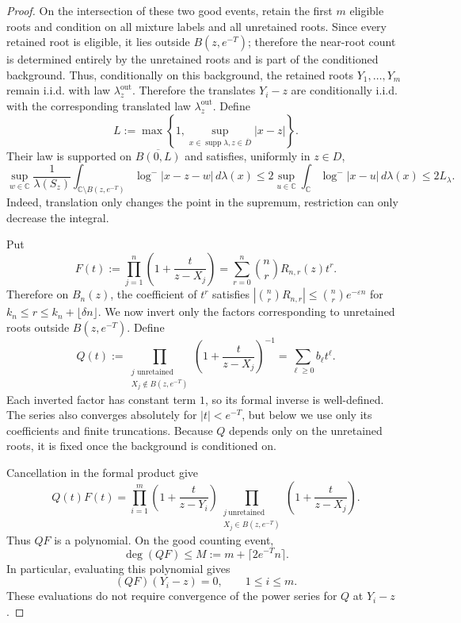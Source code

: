 \documentclass[10pt,reqno]{amsart}
\theoremstyle{remark}
\newcommand{\C}{\mathbb C}
\begin{document}
\begin{proof}
    On the intersection of these two good events, retain the first $m$ eligible roots and condition on all mixture labels and all unretained roots. Since every retained root is eligible, it lies outside $B(z,e^{-T})$; therefore the near-root count is determined entirely by the unretained roots and is part of the conditioned background. Thus, conditionally on this background, the retained roots $Y_1,\ldots, Y_m$ remain i.i.d. with law $\lambda_z^{\mathrm{out}}$. Therefore the translates $Y_i-z$ are conditionally i.i.d. with the corresponding translated law $\lambda_z^{\mathrm{out}}$. Define
    \[L:=\max\left\{1,\sup_{x\in \operatorname{supp} \lambda,z\in \overline{D}}|x-z|\right\}.\]
    Their law is supported on $\overline{B(0,L)}$ and satisfies, uniformly in $z\in D$,
    \[\sup_{w\in\C}\frac{1}{\lambda(S_z)}\int_{\C\setminus B(z,e^{-T})}\log^-|x-z-w|\,d\lambda(x)
    \le 2\sup_{u\in\C}\int_\C\log^-|x-u|\,d\lambda(x) 
    \le 2L_\lambda.\]
    Indeed, translation only changes the point in the supremum, restriction can only decrease the integral.

    Put
    \[F(t):=\prod_{j=1}^n\left(1+\frac{t}{z-X_j}\right)=\sum_{r=0}^n \binom{n}{r}R_{n,r}(z)t^r.\]
    Therefore on $B_n(z)$, the coefficient of $t^r$ satisfies $|\binom{n}{r}R_{n,r}|\le \binom{n}{r}e^{-\varepsilon n}$ for $k_n\le r\le k_n+\lfloor \delta n\rfloor$.
    We now invert only the factors corresponding to unretained roots outside $B(z,e^{-T})$. Define 
    \[Q(t):=\prod_{\substack{j\text{ unretained}\\
                     X_j\notin B(z,e^{-T})}}
    \left(1+\frac{t}{z-X_j}\right)^{-1}=\sum_{\ell\ge 0}b_\ell t^\ell.\]
    Each inverted factor has constant term $1$, so its formal inverse is well-defined. The series also converges absolutely for $|t|<e^{-T}$, but below we use only its coefficients and finite truncations. Because $Q$ depends only on the unretained roots, it is fixed once the background is conditioned on.

    Cancellation in the formal product give
    \[Q(t)F(t)=
    \prod_{i=1}^{m}\left(1+\frac{t}{z-Y_i}\right)\prod_{\substack{j\ \mathrm{unretained}\\X_j\in B(z,e^{-T})}}\left(1+\frac{t}{z-X_j}\right).\]
    Thus $QF$ is a polynomial. On the good counting event,
    \[\deg(QF)\leq M:=m+\lceil 2e^{-T}n\rceil.\]
    In particular, evaluating this polynomial gives
    \[(QF)(Y_i-z)=0,\qquad 1\leq i\leq m.\]
    These evaluations do not require convergence of the power series for $Q$ at $Y_i-z$.
    

\end{proof}
\end{document}
